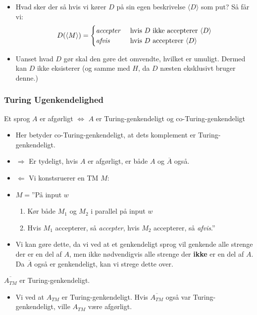 \begin{frame}[allowframebreaks]
\begin{itemize}
		\item Hvad sker der så hvis vi kører $D$ på sin egen beskrivelse $\langle D \rangle $ som put? Så får vi:
		      \begin{equation*}
			      D(\langle M \rangle ) = \begin{cases}
				      \text{\textit{accepter}} & \text{ hvis }D \text{ ikke accepterer } \langle D \rangle \\
				      \text{\textit{afvis}}    & \text{ hvis }D \text{ accepterer } \langle D \rangle
			      \end{cases}
		      \end{equation*}
		\item Uanset hvad $D$ gør skal den gøre det omvendte, hvilket er umuligt. Dermed kan $D$ ikke eksisterer (og samme med $H$, da $D$ næsten eksklusivt bruger denne.)
	\end{itemize}
\end{frame}


\begin{frame}[allowframebreaks]
	\frametitle{Turing Ugenkendelighed}
	\begin{theorem}
		Et sprog $A$ er afgørligt $\iff$ $A$ er Turing-genkendeligt og co-Turing-genkendeligt
	\end{theorem}
	\begin{itemize}
		\item Her betyder co-Turing-genkendeligt, at dets komplement er Turing-genkendeligt.
		\item \(\Rightarrow\) Er tydeligt, hvis $A$ er afgørligt, er både $A$ og $\overline{A}$ også.
		\item \(\Leftarrow\) Vi konstsruerer en TM $M$:
		\item $M = $''På input $w$
		      \begin{enumerate}
			      \item Kør både $M_{1}$ og $M_{2}$ i parallel på input $w$
			      \item Hvis $M_{1}$ accepterer, så \textit{accepter}, hvis $M_{2}$ accepterer, så \textit{afvis}.''
		      \end{enumerate}
		\item Vi kan gøre dette, da vi ved at et genkendeligt sprog vil genkende alle strenge der er en del af $A$, men ikke nødvendigvis alle strenge der \textbf{ikke} er en del af $A$. Da $\overline{A}$ også er genkendeligt, kan vi strege dette over.
	\end{itemize}

	\begin{corollary}
		$\overline{A_{TM}}$ er Turing-genkendeligt.
	\end{corollary}

	\begin{itemize}
		\item Vi ved at $A_{TM}$ er Turing-genkendeligt. Hvis $\overline{A_{TM}}$ også var Turing-genkendeligt, ville $A_{TM}$ være afgørligt.
	\end{itemize}
\end{frame}


